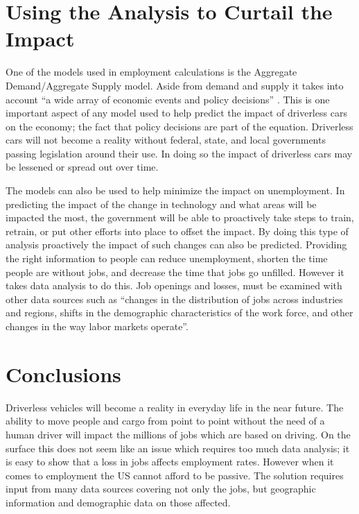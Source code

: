 \documentclass[sigconf]{acmart}
\begin{document}
\section{Using the Analysis to Curtail the Impact}

One of the models used in employment calculations is the Aggregate 
Demand/Aggregate Supply model.  Aside from demand and supply it takes into 
account ``a wide array of economic events and policy decisions''
\cite{OpenStax}. This is one important aspect of any model used to help 
predict the impact of driverless cars on the economy; the fact that policy 
decisions are part of the equation.  Driverless cars will not become a 
reality without federal, state, and local governments passing legislation 
around their use.  In doing so the impact of driverless cars may be 
lessened or spread out over time.  

The models can also be used to help minimize the impact on unemployment.  
In predicting the impact of the change in technology and what areas will 
be impacted the most, the government will be able to proactively take steps 
to train, retrain, or put other efforts into place to offset the impact.  
By doing this type of analysis proactively the impact of such changes can 
also be predicted.  Providing the right information to people can reduce 
unemployment, shorten the time people are without jobs, and decrease the 
time that jobs go unfilled.   However it takes data analysis to do this.  
Job openings and losses, must be examined with other data sources such 
as ``changes in the distribution of jobs across industries and regions, 
shifts in the demographic characteristics of the work force, and other 
changes in the way labor markets operate''\cite{JOLTS}.

\section{Conclusions}

Driverless vehicles will become a reality in everyday life in the near future.  
The ability to move people and cargo from point to point without the need of a 
human driver will impact the millions of jobs which are based on driving.  On 
the surface this does not seem like an issue which requires too much data 
analysis; it is easy to show that a loss in jobs affects employment rates.  
However when it comes to employment the US cannot afford to be passive.  The 
solution requires input from many data sources covering not only the jobs, 
but geographic information and demographic data on those affected.    
\end{document}
